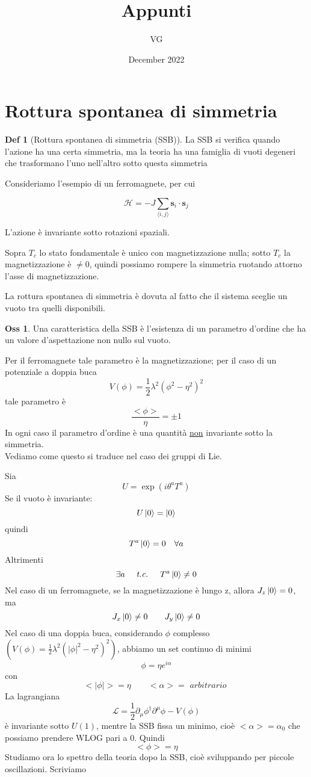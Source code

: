 \documentclass[10pt,a4paper]{article}
\title{Appunti}
\author{VG}
\date{December 2022}
\theoremstyle{definition}
\newtheorem{definition}{Def}[section]
\newtheorem{observation}{Oss}[section]
\begin{document}
\maketitle

\section{Rottura spontanea di simmetria}

\begin{definition}[Rottura spontanea di simmetria (SSB)]
    La SSB si verifica quando l'azione ha una certa simmetria, ma la teoria ha una famiglia di vuoti degeneri che trasformano l'uno nell'altro sotto questa simmetria

\end{definition}
Consideriamo l'esempio di un ferromagnete, per cui

\[
\mathcal{H} = -J\sum_{\langle i,j \rangle} \mathbf{s}_i \cdot \mathbf{s}_j
\]

L'azione è invariante sotto rotazioni spaziali.

Sopra $T_c$ lo stato fondamentale è unico con magnetizzazione nulla; sotto $T_c$ la magnetizzazione è $\neq 0$, quindi possiamo rompere la simmetria ruotando attorno l'asse di magnetizzazione.

La rottura spontanea di simmetria è dovuta al fatto che il sistema sceglie un vuoto tra quelli disponibili.

\begin{observation}
Una caratteristica della SSB è l'esistenza di un parametro d'ordine che ha un valore d'aspettazione non nullo sul vuoto.
\end{observation}
Per il ferromagnete tale parametro è la magnetizzazione; per il caso di un potenziale a doppia buca
\[
V(\phi) = \frac{1}{2}\lambda^2(\phi^2 - \eta^2)^2    
\]
tale parametro è 
\[
\frac{<\phi>}{\eta} = \pm 1    
\]
In ogni caso il parametro d'ordine è una quantità \underline{non} invariante sotto la simmetria.
\\
Vediamo come questo si traduce nel caso dei gruppi di Lie.

Sia 
\[U = \exp(i\theta^a T^a)\]
Se il vuoto è invariante:
\[
    U\ket{0} = \ket{0} 
\]
quindi
\[T^a\ket{0} = 0 \quad \forall a\]
Altrimenti 
\[
\exists a \quad \textit{ t.c. } \quad T^a\ket{0} \neq 0    
\]
Nel caso di un ferromagnete, se la magnetizzazione è lungo z, allora $J_z\ket{0} = 0$, ma
\[
J_x \ket{0} \neq 0 \qquad J_y \ket{0} \neq 0    
\]
Nel caso di una doppia buca, considerando $\phi$ complesso \((V(\phi) = \frac{1}{2}\lambda^2 (|\phi|^2 - \eta^2)^2)\), abbiamo un set continuo di minimi
\[
\phi = \eta e^{i\alpha}    
\]
con 
\[
<|\phi|> = \eta \qquad <\alpha> = \textit{ arbitrario }  
\]
La lagrangiana 
\[
\mathcal{L} = \frac12\partial_\mu\phi^\dagger \partial^\mu\phi - V(\phi)   
\]
è invariante sotto $U(1)$, mentre la SSB fissa un minimo, cioè $<\alpha> = \alpha_0$ che possiamo prendere WLOG pari a 0. Quindi
\[
<\phi> = \eta    
\]
Studiamo ora lo spettro della teoria dopo la SSB, cioè sviluppando per piccole oscillazioni. Scriviamo
\end{document}
